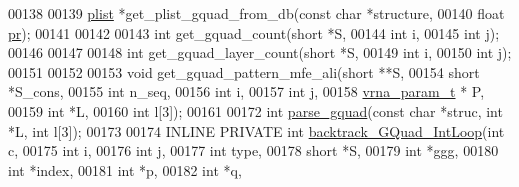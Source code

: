 \begin{DoxyCode}
00138 
00139 \hyperlink{group__struct__utils_structvrna__elem__prob__s}{plist} *get\_plist\_gquad\_from\_db(\textcolor{keyword}{const} \textcolor{keywordtype}{char} *structure,
00140                                \textcolor{keywordtype}{float}      \hyperlink{fold__vars_8h_ac98ec419070aee6831b44e5c700f090f}{pr});
00141 
00142 
00143 \textcolor{keywordtype}{int}         get\_gquad\_count(\textcolor{keywordtype}{short} *S,
00144                             \textcolor{keywordtype}{int}   i,
00145                             \textcolor{keywordtype}{int}   j);
00146 
00147 
00148 \textcolor{keywordtype}{int}         get\_gquad\_layer\_count(\textcolor{keywordtype}{short} *S,
00149                                   \textcolor{keywordtype}{int}   i,
00150                                   \textcolor{keywordtype}{int}   j);
00151 
00152 
00153 \textcolor{keywordtype}{void} get\_gquad\_pattern\_mfe\_ali(\textcolor{keywordtype}{short} **S,
00154                                \textcolor{keywordtype}{short} *S\_cons,
00155                                \textcolor{keywordtype}{int} n\_seq,
00156                                \textcolor{keywordtype}{int} i,
00157                                \textcolor{keywordtype}{int} j,
00158                                \hyperlink{group__energy__parameters_structvrna__param__s}{vrna\_param\_t} * P,
00159                                \textcolor{keywordtype}{int} *L,
00160                                \textcolor{keywordtype}{int} l[3]);
00161 
00172 \textcolor{keywordtype}{int} \hyperlink{group__gquads_gae41763215b9c64d2a7b67f0df8a28078}{parse\_gquad}(\textcolor{keyword}{const} \textcolor{keywordtype}{char} *struc, \textcolor{keywordtype}{int} *L, \textcolor{keywordtype}{int} l[3]);
00173 
00174 INLINE PRIVATE \textcolor{keywordtype}{int} \hyperlink{group__gquads_ga220c41e8dbcee940ac975b8ce88e55c5}{backtrack\_GQuad\_IntLoop}(\textcolor{keywordtype}{int}          c,
00175                                            \textcolor{keywordtype}{int}          i,
00176                                            \textcolor{keywordtype}{int}          j,
00177                                            \textcolor{keywordtype}{int}          type,
00178                                            \textcolor{keywordtype}{short}        *S,
00179                                            \textcolor{keywordtype}{int}          *ggg,
00180                                            \textcolor{keywordtype}{int}          *index,
00181                                            \textcolor{keywordtype}{int}          *p,
00182                                            \textcolor{keywordtype}{int}          *q,

\end{DoxyCode}
